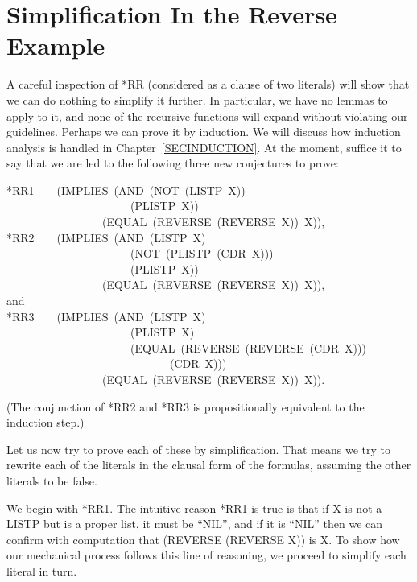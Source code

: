 \documentclass[11pt]{book}
\newenvironment{pubasis}{\begin{flushleft}\ttfamily\small}{\normalsize\rmfamily\end{flushleft}}
\newcommand{\pubdefaulttextsize}{\large}
\begin{document}
\section{Simplification In the Reverse Example}
\pubdefaulttextsize
A careful inspection of *RR (considered as a clause of two
literals) will show that we can do nothing to
simplify it further.  In particular, we have no lemmas to apply to it,
and none of the recursive functions will expand without violating our
guidelines.  Perhaps we can prove it by
induction.  We will discuss how induction analysis
is handled in Chapter~\ref{SECINDUCTION}.
At the moment, suffice it to say that 
we are led to the following three new conjectures to prove:
\begin{pubasis}
*RR1~~~~(IMPLIES~(AND~(NOT~(LISTP~X))\\
~~~~~~~~~~~~~~~~~~~~~~(PLISTP~X))\\
~~~~~~~~~~~~~~~~~(EQUAL~(REVERSE~(REVERSE~X))~X)),\\

*RR2~~~~(IMPLIES~(AND~(LISTP~X)\\
~~~~~~~~~~~~~~~~~~~~~~(NOT~(PLISTP~(CDR~X)))\\
~~~~~~~~~~~~~~~~~~~~~~(PLISTP~X))\\
~~~~~~~~~~~~~~~~~(EQUAL~(REVERSE~(REVERSE~X))~X)),\\

and\\

*RR3~~~~(IMPLIES~(AND~(LISTP~X)\\
~~~~~~~~~~~~~~~~~~~~~~(PLISTP~X)\\
~~~~~~~~~~~~~~~~~~~~~~(EQUAL~(REVERSE~(REVERSE~(CDR~X)))\\
~~~~~~~~~~~~~~~~~~~~~~~~~~~~~(CDR~X)))\\
~~~~~~~~~~~~~~~~~(EQUAL~(REVERSE~(REVERSE~X))~X)).\\
\end{pubasis}
(The conjunction of *RR2 and *RR3 is propositionally equivalent to
the induction step.)

Let us now try to prove each of these by simplification.
That means we try to rewrite each of the literals in the clausal form
of the formulas, assuming the other literals to be false.

We begin with *RR1.  The intuitive reason *RR1 is true is that
if X is not a LISTP but is a proper list, it must be ``NIL'',
and if it is ``NIL'' then we can confirm with computation that (REVERSE (REVERSE X))
is X.  To show how our mechanical process follows this line of reasoning,
we proceed to simplify each literal in turn.
\end{document}
